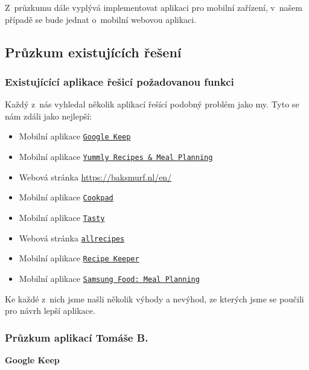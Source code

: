 \documentclass[a4paper, 11pt]{article}
\renewcommand{\t}[1]{\texttt{#1}} %
\newcommand{\sss}[1]{\subsubsection{#1}} %
\begin{document}
    Z~průzkumu dále vyplývá implementovat aplikaci pro mobilní zařízení, v~našem případě
    se bude jednat o~mobilní webovou aplikaci.


    \subsection{Průzkum existujících řešení}

    \sss{Existujícící aplikace řešicí požadovanou funkci}\label{pruz_exist_res}

    Každý z~nás vyhledal několik aplikací řešící podobný problém jako my.
    Tyto se nám zdáli jako nejlepší:
    
    \begin{itemize}
        \setlength\itemsep{0em}
        \item Mobilní aplikace 
            \t{\href{https://apps.apple.com/us/app/google-keep-notes-and-lists/id1029207872}{Google Keep}}
        \item Mobilní aplikace 
            \t{\href{https://apps.apple.com/us/app/yummly-recipes-meal-planning/id589625334}{Yummly Recipes \& Meal Planning}}
        \item Webová stránka \url{https://baksmurf.nl/en/}
        \item Mobilní aplikace
            \t{\href{https://play.google.com/store/apps/details?id=com.mufumbo.android.recipe.search&hl=cs}{Cookpad}}
        \item Mobilní aplikace
			\t{\href{https://tasty.co/}{Tasty}}
        \item Webová stránka
			\t{\href{https://www.allrecipes.com/}{allrecipes}}
        \item Mobilní aplikace
            \t{\href{https://play.google.com/store/apps/details?id=com.tudorspan.recipekeeper}{Recipe Keeper}}
        \item Mobilní aplikace
            \t{\href{https://play.google.com/store/apps/details?id=com.foodient.whisk&hl=en&pli=1}{Samsung Food: Meal Planning}}
    \end{itemize}

    \noindent Ke každé z~nich jsme našli několik výhody a nevýhod,
    ze kterých jsme se poučili pro návrh lepší aplikace.

    \sss{Průzkum aplikací Tomáše B.}

    \noindent\textbf{Google Keep} 
\end{document}
